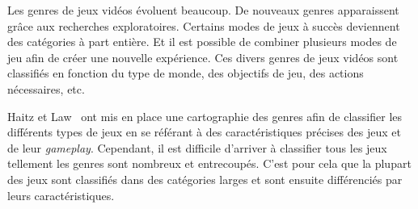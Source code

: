 Les genres de jeux vidéos évoluent beaucoup.
De nouveaux genres apparaissent grâce aux recherches exploratoires.
Certains modes de jeux à succès deviennent des catégories à part entière.
Et il est possible de combiner plusieurs modes de jeu afin de créer une nouvelle expérience.
Ces divers genres de jeux vidéos sont classifiés en fonction du type de monde, des objectifs de jeu, des actions nécessaires, etc. 

Haitz et Law~\cite{HeintzStephanie2015TGGM} ont mis en place une cartographie des genres afin de classifier les différents types de jeux en se référant à des caractéristiques précises des jeux et de leur \emph{gameplay}.
Cependant, il est difficile d'arriver à classifier tous les jeux tellement les genres sont nombreux et entrecoupés.
C'est pour cela que la plupart des jeux sont classifiés dans des catégories larges et sont ensuite différenciés par leurs caractéristiques.


